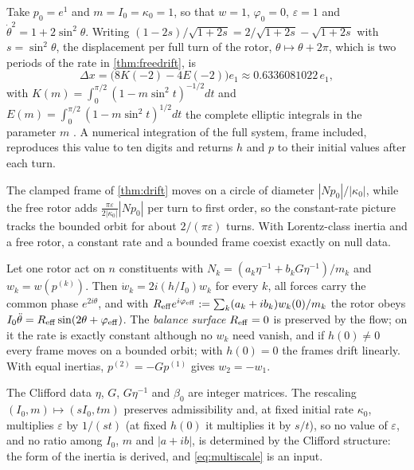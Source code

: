 \begin{example}
\label{ex:drift}
Take $p_0=e^1$ and $m=I_0=\kappa_0=1$, so that $w=1$, $\varphi_0=0$, $\varepsilon=1$ and $\dot\theta^2=1+2\sin^2\theta$. Writing
$(1-2s)/\sqrt{1+2s}=2/\sqrt{1+2s}-\sqrt{1+2s}$ with $s=\sin^2\theta$, the displacement per full turn of the rotor, $\theta\mapsto\theta+2\pi$, which is two periods of the rate in
\cref{thm:freedrift}, is
\[
\Delta x=\bigl(8K(-2)-4E(-2)\bigr)e_1\approx0.6336081022\,e_1 ,
\]
with $K(m)=\int_0^{\pi/2}(1-m\sin^2t)^{-1/2}dt$ and $E(m)=\int_0^{\pi/2}(1-m\sin^2t)^{1/2}dt$ the complete elliptic integrals in the parameter $m$
\cite{DLMF}. A numerical integration of the full system, frame included, reproduces this value to ten digits and returns $h$ and $p$ to their
initial values after each turn.
\end{example}

The clamped frame of \cref{thm:drift} moves on a circle of diameter $|Np_0|/|\kappa_0|$, while the free rotor adds $\tfrac{\pi\varepsilon}{2|\kappa_0|}|Np_0|$
per turn to first order, so the constant-rate picture tracks the bounded orbit for about $2/(\pi\varepsilon)$ turns. With Lorentz-class inertia and a
free rotor, a constant rate and a bounded frame coexist exactly on null data.

\begin{proposition}
\label{prop:several}
Let one rotor act on $n$ constituents with $N_k=(a_k\eta^{-1}+b_kG\eta^{-1})/m_k$ and $w_k=w(p^{(k)})$. Then $\dot w_k=2i(h/I_0)w_k$ for every $k$, all
forces carry the common phase $e^{2i\theta}$, and with $R_{\rm eff}e^{i\varphi_{\rm eff}}:=\sum_k(a_k+ib_k)w_k(0)/m_k$ the rotor obeys
$I_0\ddot\theta=R_{\rm eff}\sin(2\theta+\varphi_{\rm eff})$. The \emph{balance surface} $R_{\rm eff}=0$ is preserved by the flow; on it the rate is exactly
constant although no $w_k$ need vanish, and if $h(0)\neq0$ every frame moves on a bounded orbit; with $h(0)=0$ the frames drift linearly. With
equal inertias, $p^{(2)}=-Gp^{(1)}$ gives $w_2=-w_1$.
\end{proposition}

The Clifford data $\eta$, $G$, $G\eta^{-1}$ and $\beta_0$ are integer matrices. The rescaling $(I_0,m)\mapsto(sI_0,tm)$ preserves admissibility and,
at fixed initial rate $\kappa_0$, multiplies $\varepsilon$ by $1/(st)$ (at fixed $h(0)$ it multiplies it by $s/t$), so no value of $\varepsilon$, and no ratio among $I_0$, $m$ and $|a+ib|$, is determined by the Clifford structure:
the form of the inertia is derived, and \eqref{eq:multiscale} is an input.

